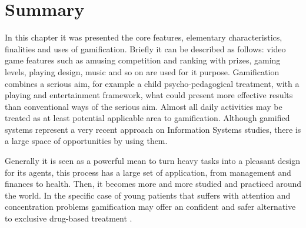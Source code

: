 \section{Summary}

In this chapter it was presented the core features, elementary characteristics, finalities and uses of gamification. Briefly it can be described as follows: video game features such as amusing competition and ranking with prizes, gaming levels, playing design, music and so on are used for it purpose. Gamification combines a serious aim, for example a child psycho-pedagogical treatment, with a playing and entertainment framework, what could present more effective results than conventional ways of the serious aim. Almost all daily activities may be treated as at least potential applicable area to gamification. Although gamified systems represent a very recent approach on Information Systems studies, there is a large space of opportunities by using them.

Generally it is seen as a powerful mean to turn heavy tasks into a pleasant design for its agents, this process has a large set of application, from management and finances to health.  Then, it becomes more and more studied and practiced around the world. In the specific case of young patients that suffers with attention and concentration problems gamification may offer an confident and safer alternative to exclusive drug-based treatment \citep{Nemeth}.